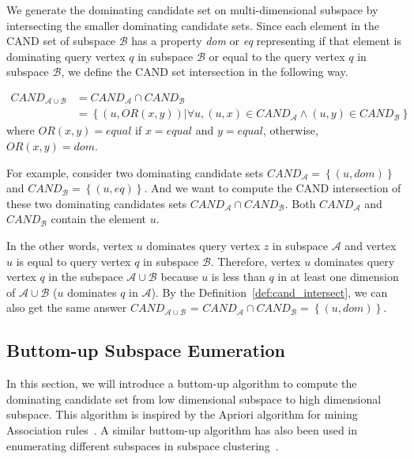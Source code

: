 We generate the dominating candidate set on multi-dimensional subspace by intersecting the smaller dominating candidate sets. Since each element in the CAND set of subspace $\mathcal{B}$ has a property \emph{dom} or \emph{eq} representing if that element is dominating query vertex $q$ in subspace $\mathcal{B}$ or equal to the query vertex $q$ in subspace $\mathcal{B}$, we define the CAND set intersection in the following way.

\begin{definition}
\label{def:cand_intersect}
\begin{equation}
\begin{split}
\mathit{CAND}_{\mathcal{A} \cup \mathcal{B}} &= \mathit{CAND}_\mathcal{A} \cap \mathit{CAND}_\mathcal{B}\\
           &= \left\{(u, OR(x, y)) |\forall u, (u, x)\in \mathit{CAND}_\mathcal{A} \wedge (u, y)\in \mathit{CAND}_\mathcal{B} \right\}
\end{split}
\end{equation}
where $OR(x, y) = equal$ if $x = equal$ and $y = equal$, otherwise, $OR(x, y) = dom$.
\end{definition}

For example, consider two dominating candidate sets $\mathit{CAND}_\mathcal{A} = \left\{(u, dom)\right\}$ and $\mathit{CAND}_\mathcal{B} = \left\{(u, eq)\right\}$. And we want to compute the CAND intersection of these two dominating candidates sets $\mathit{CAND}_\mathcal{A} \cap \mathit{CAND}_\mathcal{B}$. 
Both $\mathit{CAND}_\mathcal{A}$ and $\mathit{CAND}_\mathcal{B}$ contain the element $u$. 

In the other words, vertex $u$ dominates query vertex $z$ in subspace $\mathcal{A}$ and vertex $u$ is equal to query vertex $q$ in subspace $\mathcal{B}$. 
Therefore, vertex $u$ dominates query vertex $q$ in the subspace $\mathcal{A} \cup \mathcal{B}$ because $u$ is less than $q$ in at least one dimension of $\mathcal{A} \cup \mathcal{B}$ ($u$ dominates $q$ in $\mathcal{A}$). By the Definition~\ref{def:cand_intersect}, we can also get the same answer $\mathit{CAND}_{\mathcal{A} \cup \mathcal{B}}$ = $\mathit{CAND}_\mathcal{A} \cap \mathit{CAND}_\mathcal{B} = \left\{(u, dom)\right\}$.


\subsection{Buttom-up Subspace Eumeration}

In this section, we will introduce a buttom-up algorithm to compute the dominating candidate set from low dimensional subspace to high dimensional subspace.
This algorithm is inspired by the Apriori algorithm for mining Association rules~\cite{agrawal1996fast}. A similar buttom-up algorithm has also been used in enumerating different subspaces in subspace clustering~\cite{agrawal1998automatic}.


